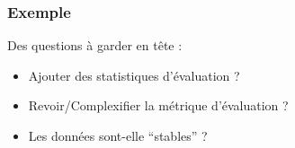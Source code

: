 \begin{frame}
  \frametitle{Exemple}
  Des questions à garder en tête :
  \begin{itemize}
  \item Ajouter des statistiques d'évaluation ?
  \item Revoir/Complexifier la métrique d'évaluation ?
  \item Les données sont-elle ``stables'' ?
  \end{itemize}
\end{frame}

